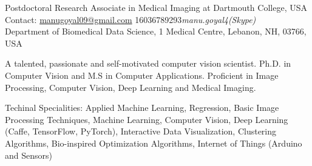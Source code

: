 \documentclass[10pt,a4paper]{article} %
\begin{document}
 
	
	
	
	\noindent Postdoctoral Research Associate in Medical Imaging at Dartmouth College, USA \\
	Contact: \href{mailto:manugoyal09@gmail.com.com}{manugoyal09@gmail.com}\bull %
	\textsmaller{+}16036789293\bull  \textit{manu.goyal4(Skype)}\\ %
	Department of Biomedical Data Science, 1 Medical Centre, Lebanon, NH, 03766, USA %
	
	\spacedhrule{0.9em}{-0.4em} %
	
	
	
	\inlineheadsection 
	{A talented, passionate and self-motivated computer vision scientist.} 
	{Ph.D. in Computer Vision and M.S in Computer Applications. Proficient in Image Processing, Computer Vision, Deep Learning and Medical Imaging.}
	
	
	
	\spacedhrule{1.2em}{-0.4em} %
	
	
	
	
	
	
	
	
	
	\inlineheadsection 
	{Techinal Specialities:}
	{Applied Machine Learning, Regression, Basic Image Processing Techniques, Machine Learning, Computer Vision, Deep Learning (Caffe, TensorFlow, PyTorch), Interactive Data Visualization, Clustering Algorithms, Bio-inspired Optimization Algorithms, Internet of Things (Arduino and Sensors)}
	
\end{document}
